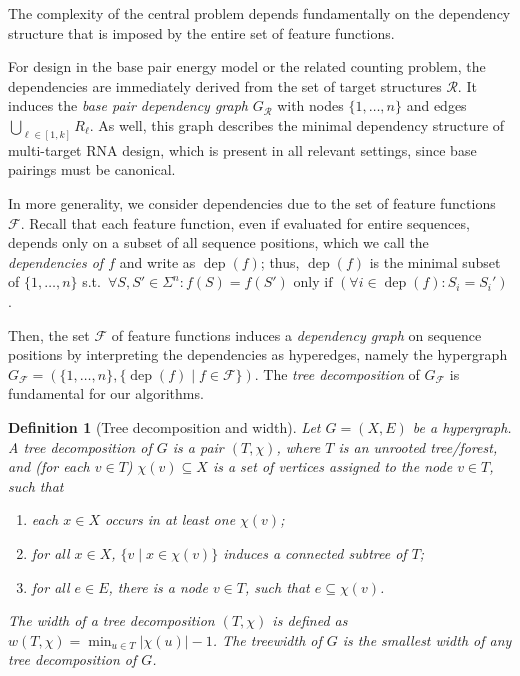 \documentclass{bmcart}
\newtheorem{definition}[theorem]{Definition}
\newcommand{\dep}{\operatorname{dep}}
\newcommand{\F}{\mathcal{F}}
\newcommand{\R}{\mathcal{R}}
\newcommand{\width}{w}
\newcommand{\Def}[1]{\emph{#1}}
\begin{document}
The complexity of the central problem depends fundamentally on the dependency structure that is imposed by the entire set of feature functions.

For design in the base pair energy model or the related counting problem, the dependencies are immediately derived from the set of target structures 
$\R$. It induces the
\Def{base pair dependency graph} $G_{\R}$ with nodes $\{1,\dots,n\}$
and edges $\bigcup_{\ell\in[1,k]} R_\ell$. As well, this graph describes the minimal
dependency structure of multi-target RNA design, which is present in all relevant settings, since base pairings must be canonical.

In more generality, we consider dependencies due to the set of feature functions $\F$.
Recall that each feature function, even if evaluated for entire sequences, depends only on a subset of all sequence positions, which we call the \Def{dependencies of $f$} and write as $\dep(f)$;
thus, $\dep(f)$ is the minimal subset of $\{1,\dots,n\}$ s.t.~$\forall S,S'\in\Sigma^n: f(S)=f(S') \text{ only if } (\forall i\in\dep(f): S_i=S_i')$.
  
Then, the set $\F$ of feature functions induces a
  \Def{dependency graph} on sequence positions by interpreting the dependencies as hyperedges, namely the hypergraph 
  $G_\F=(\{1,\dots,n\} ,\{\dep(f)\mid f\in \F\})$. The \Def{tree decomposition} of $G_\F$ is fundamental for our algorithms.

\begin{definition}[Tree decomposition and width]
  \label{def:treedecomp}
  Let $G=(X, E)$ be a hypergraph. A \Def{tree decomposition} of $G$ is
  a pair $(T,\chi)$, where $T$ is an unrooted tree/forest, and (for
  each $v\in T$) $\chi(v)\subseteq X$ is a set of vertices assigned to
  the node $v\in T$, such that
\begin{enumerate}
\item each $x\in X$ occurs in at least one $\chi(v)$;
\item for all $x\in X$, $\{ v \mid x \in \chi(v) \}$ induces a connected subtree of $T$;
\item for all $e\in E$, there is a node $v\in T$, such that $e\subseteq\chi(v)$.
\end{enumerate}
The \Def{width} of a tree decomposition $(T,\chi)$ is defined as
$\width(T,\chi) = \min_{u\in T} |\chi(u)| - 1 $. The \Def{treewidth}
of $G$ is the smallest width of any tree decomposition of $G$.
\end{definition}
\end{document}
